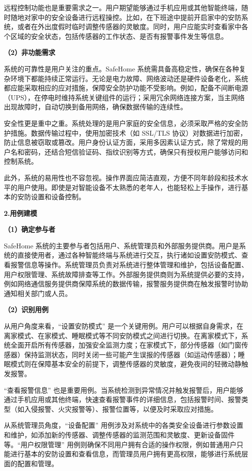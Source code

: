 远程控制功能也是重要需求之一。用户期望能够通过手机应用或其他智能终端，随时随地对家中的安全设备进行远程操控。比如，在下班途中提前开启家中的安防系统，或者在外出度假时临时调整传感器的灵敏度。同时，用户应能实时查看家中各个区域的安全状态，包括传感器的工作状态、是否有报警事件发生等信息。

\textbf{（2）非功能需求}

系统的可靠性是用户关注的重点。SafeHome 系统需具备高稳定性，确保在各种复杂环境下都能持续正常运行。无论是电力故障、网络波动还是硬件设备老化，系统都应能采取相应的应对措施，保障安全防护功能不受影响。例如，配备不间断电源（UPS），在停电时维持系统关键组件的运行；采用冗余网络连接方案，当主网络出现故障时，自动切换到备用网络，确保数据传输的连续性。

安全性更是重中之重。系统处理的是用户家庭的安全信息，必须采取严格的安全防护措施。数据传输过程中，使用加密技术（如 SSL/TLS 协议）对数据进行加密，防止信息被窃取或篡改。用户身份认证方面，采用多因素认证方式，除了常规的用户名和密码，还结合短信验证码、指纹识别等方式，确保只有授权用户能够访问和控制系统。

此外，系统的易用性也不容忽视。操作界面应简洁直观，方便不同年龄段和技术水平的用户使用。即使是对智能设备不太熟悉的老年人，也能轻松上手操作，进行基本的安防设置和设备控制。

\textbf{2.用例建模}

\textbf{（1）确定参与者}

SafeHome 系统的主要参与者包括用户、系统管理员和外部服务提供商。用户是系统的直接使用者，通过各种智能终端与系统进行交互，执行诸如设置安防模式、查看报警信息等操作。系统管理员负责对系统进行整体管理和维护，包括设备配置、用户权限管理、系统故障排查等工作。外部服务提供商则为系统提供必要的支持，例如网络通信服务提供商保障系统的数据传输，报警服务提供商在触发报警时协助通知相关部门或人员。

\textbf{（2）识别用例}

从用户角度来看，``设置安防模式'' 是一个关键用例。用户可以根据自身需求，在离家模式、在家模式、睡眠模式等不同安防模式之间进行切换。在离家模式下，系统全面开启所有传感器，加强安全监测力度；在家模式下，部分传感器（如门窗传感器）保持监测状态，同时关闭一些可能产生误报的传感器（如运动传感器）；睡眠模式则在保障基本安全的前提下，调整传感器的灵敏度，避免夜间的轻微动静触发报警。

``查看报警信息'' 也是重要用例。当系统检测到异常情况并触发报警后，用户能够通过手机应用或其他终端，快速查看报警事件的详细信息，包括报警时间、报警类型（如入侵报警、火灾报警等）、报警位置等，以便及时采取应对措施。

从系统管理员角度，``设备配置'' 用例涉及对系统中的各类安全设备进行参数设置和维护，如添加新的传感器、调整传感器的监测范围和灵敏度、更新设备固件等。``用户权限管理'' 用例则确保不同用户拥有合适的操作权限，例如普通用户只能进行基本的安防设置和查看信息，而管理员用户拥有更高权限，能够进行系统层面的配置和管理。

